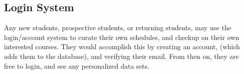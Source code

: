 \subsection*{Login System}
%

Any new students, prospective students, or returning students, may use the login/account system to curate their own schedules, and checkup on their own interested courses. They would accomplish this by creating an account, (which adds them to the database), and verifying their email. From then on, they are free to login, and see any personalized data sets.
